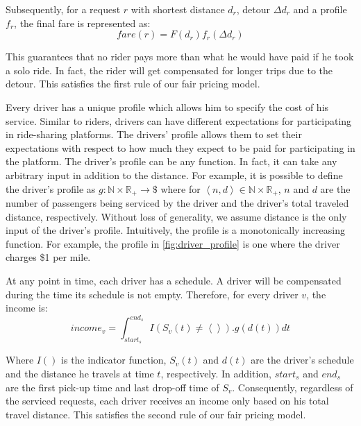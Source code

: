 Subsequently, for a request $r$ with shortest distance $d_r$, detour $\Delta d_r$ and a profile $f_r$, the final fare is represented as:
\vspace{-1.5mm}
\begin{equation}
\label{eq:fare}
fare(r) = F(d_r) f_r(\Delta d_r)
\end{equation}

\noindent This guarantees that no rider pays more than what he would have paid if he took a solo ride. In fact, the rider will get compensated for longer trips due to the detour. This satisfies the first rule of our fair pricing model.

Every driver has a unique profile which allows him to specify the cost of his service. Similar to riders, drivers can have different expectations for participating in ride-sharing platforms. The drivers' profile allows them to set their expectations with respect to how much they expect to be paid for participating in the platform. The driver's profile can be any function. In fact, it can take any arbitrary input in addition to the distance. For example, it is possible to define the driver's profile as $g: \mathbb{N} \times \mathbb{R}_{+}  \rightarrow \$$ where for $\left\langle n, d \right\rangle \in \mathbb{N} \times \mathbb{R}_{+}$, $n$ and $d$ are the number of passengers being serviced by the driver and the driver's total traveled distance, respectively. Without loss of generality, we assume distance is the only input of the driver's profile. Intuitively, the profile is a monotonically increasing function. For example, the profile in \cref{fig:driver_profile} is one where the driver charges \$1 per mile.

At any point in time, each driver has a schedule. A driver will be compensated during the time its schedule is not empty. Therefore, for every driver $v$, the income is:
\vspace{-2mm}
\begin{equation}
\label{eq:payment}
income_v = \int_{start_s}^{end_s} I\left( S_v(t) \neq \left\langle \right\rangle\right).g(d(t))dt
\end{equation}

\noindent Where $I()$ is the indicator function, $S_v(t)$ and $d(t)$ are the driver's schedule and the distance he travels at time $t$, respectively. In addition, $start_s$ and $end_s$ are the first pick-up time and last drop-off time of $S_v$. Consequently, regardless of the serviced requests, each driver receives an income only based on his total travel distance. This satisfies the second rule of our fair pricing model.

